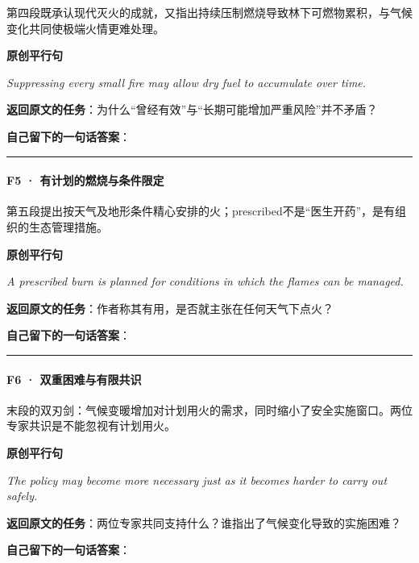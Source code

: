 \documentclass[
  11pt,
]{ctexart}
\renewenvironment{quote}{\begin{tcolorbox}[enhanced,breakable,colback=sand,colframe=primary!22,boxrule=0.4pt,arc=2pt,left=2.6mm,right=2.6mm,top=1.6mm,bottom=1.6mm]\itshape}{\end{tcolorbox}}
\begin{document}
第四段既承认现代灭火的成就，又指出持续压制燃烧导致林下可燃物累积，与气候变化共同使极端火情更难处理。

\textbf{原创平行句}

\begin{quote}
Suppressing every small fire may allow dry fuel to accumulate over time.
\end{quote}

\textbf{返回原文的任务}：为什么``曾经有效''与``长期可能增加严重风险''并不矛盾？

\textbf{自己留下的一句话答案}：

\rule{0.75\linewidth}{0.35pt}

\paragraph{F5 ·
有计划的燃烧与条件限定}\label{f5-ux6709ux8ba1ux5212ux7684ux71c3ux70e7ux4e0eux6761ux4ef6ux9650ux5b9a}

第五段提出按天气及地形条件精心安排的火；prescribed不是``医生开药''，是有组织的生态管理措施。

\textbf{原创平行句}

\begin{quote}
A prescribed burn is planned for conditions in which the flames can be
managed.
\end{quote}

\textbf{返回原文的任务}：作者称其有用，是否就主张在任何天气下点火？

\textbf{自己留下的一句话答案}：

\rule{0.75\linewidth}{0.35pt}

\paragraph{F6 ·
双重困难与有限共识}\label{f6-ux53ccux91cdux56f0ux96beux4e0eux6709ux9650ux5171ux8bc6}

末段的双刃剑：气候变暖增加对计划用火的需求，同时缩小了安全实施窗口。两位专家共识是不能忽视有计划用火。

\textbf{原创平行句}

\begin{quote}
The policy may become more necessary just as it becomes harder to carry
out safely.
\end{quote}

\textbf{返回原文的任务}：两位专家共同支持什么？谁指出了气候变化导致的实施困难？

\textbf{自己留下的一句话答案}：
\end{document}

